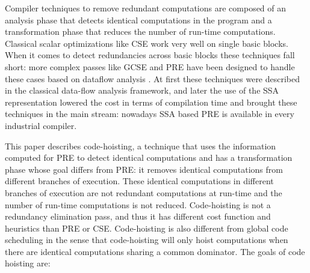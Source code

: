 \documentclass{sig-alternate}
\begin{document}
Compiler techniques to remove redundant computations are composed of an analysis
phase that detects identical computations in the program and a transformation
phase that reduces the number of run-time computations.  Classical scalar
optimizations like CSE \cite{dragonbook} work very well on single basic blocks.
When it comes to detect redundancies across basic blocks these techniques fall
short: more complex passes like GCSE and PRE have been designed to handle these
cases based on dataflow analysis \cite{morel1979global}.  At first these
techniques were described in the classical data-flow analysis framework, and
later the use of the SSA representation lowered the cost in terms of compilation
time \cite{briggs1994effective,chow1997new,kennedy1999partial} and brought these
techniques in the main stream: nowadays SSA based PRE is available in every
industrial compiler.

This paper describes code-hoisting, a technique that uses the information
computed for PRE to detect identical computations and has a transformation phase
whose goal differs from PRE: it removes identical computations from different
branches of execution.  These identical computations in different branches of
execution are not redundant computations at run-time and the number of run-time
computations is not reduced. Code-hoisting is not a redundancy elimination pass,
and thus it has different cost function and heuristics than PRE or CSE.
Code-hoisting is also different from global code scheduling
\cite{dragonbook,click1995global} in the sense that code-hoisting will only
hoist computations when there are identical computations sharing a common
dominator. The goals of code hoisting are:
\end{document}
